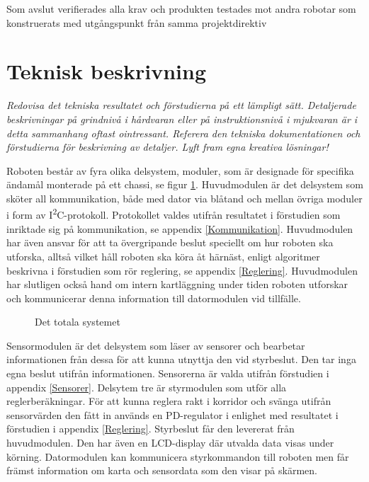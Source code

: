 \documentclass[11pt]{article}
\begin{document}
\begin{flushleft}
Som avslut verifierades alla krav och produkten testades mot andra robotar som konstruerats med utgångspunkt från samma projektdirektiv

\pagebreak

\section{Teknisk beskrivning}
\textit{Redovisa det tekniska resultatet och förstudierna på ett lämpligt sätt. Detaljerade beskrivningar på grindnivå i hårdvaran eller på instruktionsnivå i mjukvaran är i detta sammanhang oftast ointressant. Referera den tekniska dokumentationen och förstudierna för beskrivning av detaljer. Lyft fram egna kreativa lösningar!}

Roboten består av fyra olika delsystem, moduler, som är designade för specifika ändamål monterade på ett chassi, se figur \ref{overview}. Huvudmodulen är det delsystem som sköter all kommunikation, både med dator via blåtand och mellan övriga moduler i form av I\textsuperscript{2}C-protokoll. Protokollet valdes utifrån resultatet i förstudien som inriktade sig på kommunikation, se appendix \ref{Kommunikation}. Huvudmodulen har även ansvar för att ta övergripande beslut speciellt om hur roboten ska utforska, alltså vilket håll roboten ska köra åt härnäst, enligt algoritmer beskrivna i förstudien som rör reglering, se appendix \ref{Reglering}. Huvudmodulen har slutligen också hand om intern kartläggning under tiden roboten utforskar och kommunicerar denna information till datormodulen vid tillfälle. 

\begin{figure}[!htbp]
\centering
\noindent\resizebox{.7\linewidth}{!}{
	}
	\caption{Det totala systemet \label{overview}}	
\end{figure}

Sensormodulen är det delsystem som läser av sensorer och bearbetar informationen från dessa för att kunna utnyttja den vid styrbeslut. Den tar inga egna beslut utifrån informationen. Sensorerna är valda utifrån förstudien i appendix \ref{Sensorer}. Delsytem tre är styrmodulen som utför alla reglerberäkningar. För att kunna reglera rakt i korridor och svänga utifrån sensorvärden den fått in används en PD-regulator i enlighet med resultatet i förstudien i appendix \ref{Reglering}. Styrbeslut får den levererat från huvudmodulen. Den har även en LCD-display där utvalda data visas under körning. Datormodulen kan kommunicera styrkommandon till roboten men får främst information om karta och sensordata som den visar på skärmen. 


\end{flushleft}
\end{document}
